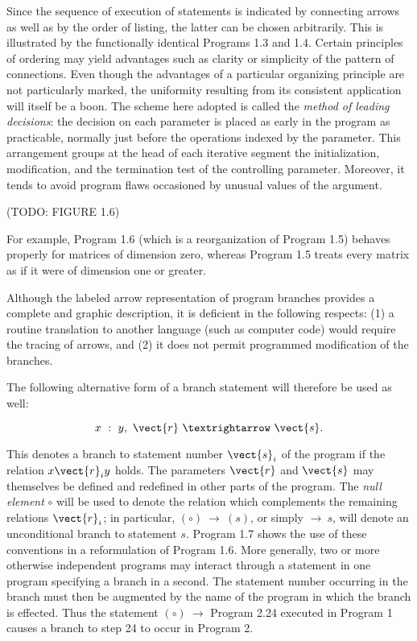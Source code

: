 \par Since the sequence of execution of statements is indicated by connecting arrows as well as by the order of listing, the latter can be chosen arbitrarily. This is illustrated by the functionally identical Programs 1.3 and 1.4. Certain principles of ordering may yield advantages such as clarity or simplicity of the pattern of connections. Even though the advantages of a particular organizing principle are not particularly marked, the uniformity resulting from its consistent application will itself be a boon. The scheme here adopted is called the \textit{method of leading decisions}: the decision on each parameter is placed as early in the program as practicable, normally just before the operations indexed by the parameter. This arrangement groups at the head of each iterative segment the initialization, modification, and the termination test of the controlling parameter. Moreover, it tends to avoid program flaws occasioned by unusual values of the argument.

\par (TODO: FIGURE 1.6)

\par For example, Program 1.6 (which is a reorganization of Program 1.5) behaves properly for matrices of dimension zero, whereas Program 1.5 treats every matrix as if it were of dimension one or greater.

\par Although the labeled arrow representation of program branches provides a complete and graphic description, it is deficient in the following respects: (1) a routine translation to another language (such as computer code) would require the tracing of arrows, and (2) it does not permit programmed modification of the branches.

\par The following alternative form of a branch statement will therefore be used as well:

$$
x\ :\ y,\ \vect{r}\ →\ \vect{s}.
$$

\par This denotes a branch to statement number $\vect{s}_i$ of the program if the relation $x\vect{r}_i y$ holds. The parameters $\vect{r}$ and $\vect{s}$ may themselves be defined and redefined in other parts of the program. The \textit{null element} $∘$ will be used to denote the relation which complements the remaining relations $\vect{r}_i$; in particular, $(∘)\ →\ (s)$, or simply $→\ s$, will denote an unconditional branch to statement $s$. Program 1.7 shows the use of these conventions in a reformulation of Program 1.6. More generally, two or more otherwise independent programs may interact through a statement in one program specifying a branch in a second. The statement number occurring in the branch must then be augmented by the name of the program in which the branch is effected. Thus the statement $(∘)\ →$ Program 2.24 executed in Program 1 causes a branch to step 24 to occur in Program 2.

